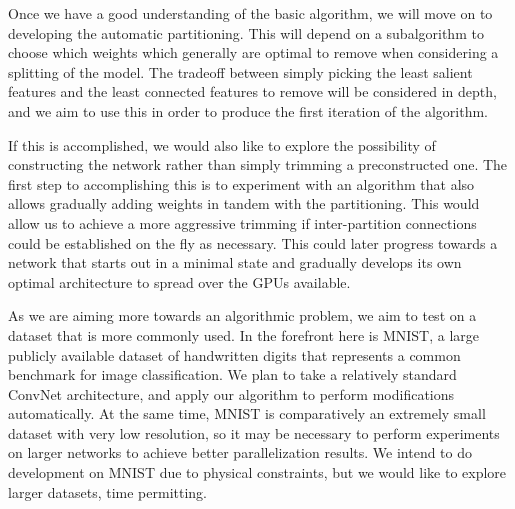 \documentclass[11pt]{article}
\begin{document}
Once we have a good understanding of the basic algorithm, we will move on to developing the automatic partitioning.
This will depend on a subalgorithm to choose which weights which generally are optimal to remove when considering a splitting of the model.
The tradeoff between simply picking the least salient features and the least connected features to remove will be considered in depth, and we aim to use this in order to produce the first iteration of the algorithm.

If this is accomplished, we would also like to explore the possibility of constructing the network rather than simply trimming a preconstructed one. 
The first step to accomplishing this is to experiment with an algorithm that also allows gradually adding weights in tandem with the partitioning.
This would allow us to achieve a more aggressive trimming if inter-partition connections could be established on the fly as necessary.
This could later progress towards a network that starts out in a minimal state and gradually develops its own optimal architecture to spread over the GPUs available.

As we are aiming more towards an algorithmic problem, we aim to test on a dataset that is more commonly used.
In the forefront here is MNIST, a large publicly available dataset of handwritten digits that represents a common benchmark for image classification.
We plan to take a relatively standard ConvNet architecture, and apply our algorithm to perform modifications automatically.
At the same time, MNIST is comparatively an extremely small dataset with very low resolution, so it may be necessary to perform experiments on larger networks to achieve better parallelization results.
We intend to do development on MNIST due to physical constraints, but we would like to explore larger datasets, time permitting.
\end{document}
